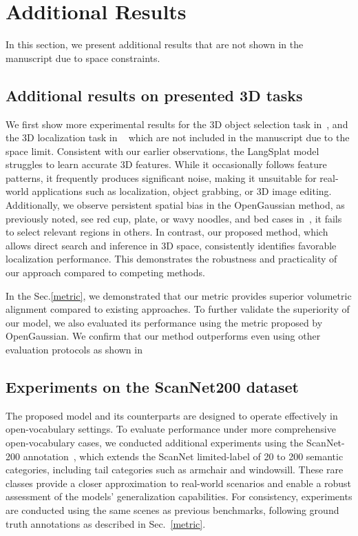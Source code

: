 \section{Additional Results}
\label{additional results}
In this section, we present additional results that are not shown in the manuscript due to space constraints. 

\subsection{Additional results on presented 3D tasks}
\label{3D tasks}
We first show more experimental results for the 3D object selection task in~, and the 3D localization task in ~ which are not included in the manuscript due to the space limit. Consistent with our earlier observations, the LangSplat model struggles to learn accurate 3D features. While it occasionally follows feature patterns, it frequently produces significant noise, making it unsuitable for real-world applications such as localization, object grabbing, or 3D image editing. Additionally, we observe persistent spatial bias in the OpenGaussian method, as previously noted, see red cup, plate, or wavy noodles, and bed cases in~, it fails to select relevant regions in others.
In contrast, our proposed method, which allows direct search and inference in 3D space, consistently identifies favorable localization performance. This demonstrates the robustness and practicality of our approach compared to competing methods.

In the Sec.\ref{metric}, we demonstrated that our metric provides superior volumetric alignment compared to existing approaches. To further validate the superiority of our model, we also evaluated its performance using the metric proposed by OpenGaussian. We confirm that our method outperforms even using other evaluation protocols as shown in~




\subsection{Experiments on the ScanNet200 dataset}
\label{scannet200}
The proposed model and its counterparts are designed to operate effectively in open-vocabulary settings. 
To evaluate performance under more comprehensive open-vocabulary cases, we conducted additional experiments using the ScanNet-200 annotation~\cite{scannet200}, which extends the ScanNet limited-label of 20 to 200 semantic categories, including tail categories such as armchair and windowsill. These rare classes provide a closer approximation to real-world scenarios and enable a robust assessment of the models' generalization capabilities. For consistency, experiments are conducted using the same scenes as previous benchmarks, following ground truth annotations as described in Sec.~\ref{metric}. 


